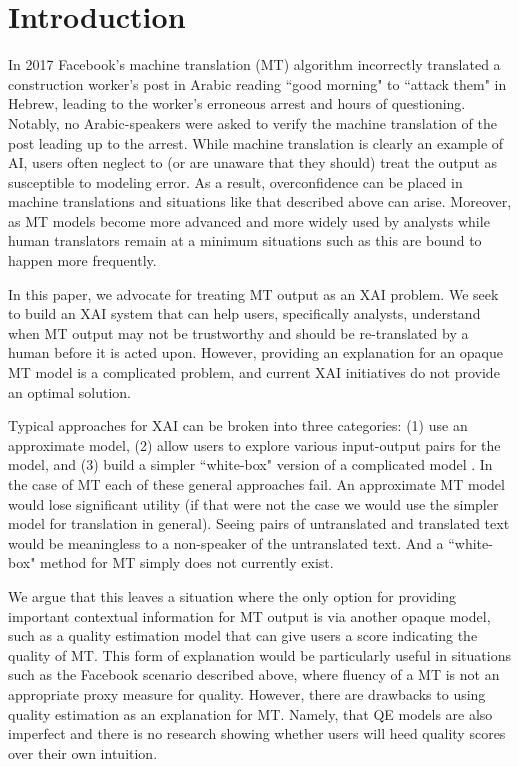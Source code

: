 \section{Introduction}

In 2017 Facebook's machine translation (MT) algorithm incorrectly translated a construction worker's post in Arabic reading ``good morning" to ``attack them" in Hebrew, leading to the worker's erroneous arrest and hours of questioning. Notably, no Arabic-speakers were asked to verify the machine translation of the  post leading up to the arrest\cite{hernFacebook2017}. While machine translation is clearly an example of AI, users often neglect to (or are unaware that they should) treat the output as susceptible to modeling error. As a result, overconfidence can be placed in machine translations and situations like that described above can arise. Moreover, as MT models become more advanced and more widely used by analysts while human translators remain at a minimum situations such as this are bound to happen more frequently.  

In this paper, we advocate for treating MT output as an XAI problem. We seek to build an XAI system that can help users, specifically analysts, understand when MT output may not be trustworthy and should be re-translated by a human before it is acted upon. However, providing an explanation for an opaque  MT model is a complicated problem, and current XAI initiatives do not provide an optimal solution.   

Typical approaches for XAI can be broken into three categories: (1) use an approximate model, (2) allow users to explore various input-output pairs for the model, and (3) build a simpler ``white-box" version of a complicated model \cite{RiberoLIME2016, SelbstBarocasIntuitive2018, MittelstadtRussellExplain2019}. In the case of MT each of these general approaches fail. An approximate MT model would lose significant utility (if that were not the case we would use the simpler model for translation in general). Seeing pairs of untranslated and translated text would be meaningless to a non-speaker of the untranslated text. And a ``white-box" method for MT simply does not currently exist.      

We argue that this leaves a situation where the only option for providing important contextual information for MT output is via another opaque model, such as a quality estimation model that can give users a score indicating the quality of MT. This form of explanation would be particularly useful in situations such as the Facebook scenario described above, where fluency of a MT is not an appropriate proxy measure for quality. However, there are drawbacks to using quality estimation as an explanation for MT. Namely, that QE models are also imperfect and there is no research showing whether users will heed quality scores over their own intuition.  

